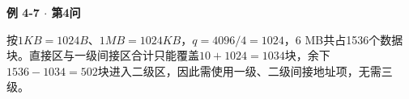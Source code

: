 {\color{ink}\bfseries 例 4-7 \(\cdot \) 第4问}\par\vspace{1bp}按\(1 KB=\allowbreak{}1024 B\)、\(1 MB=\allowbreak{}1024 KB\)，\(q=\allowbreak{}4096/\allowbreak{}4=\allowbreak{}1024\)，6 MB共占1536个数据块。直接区与一级间接区合计只能覆盖\(10+\allowbreak{}1024=\allowbreak{}1034\)块，余下\(1536-1034=\allowbreak{}502\)块进入二级区，因此需使用一级、二级间接地址项，无需三级。
